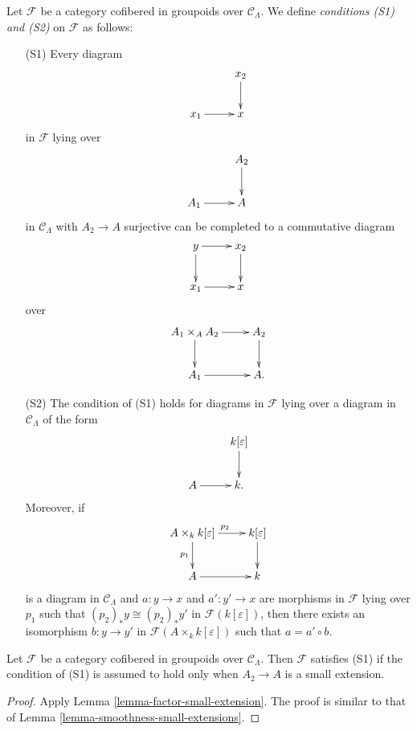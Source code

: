 \begin{definition}
\label{definition-S1-S2}
Let $\mathcal F$ be a category cofibered in groupoids over $\mathcal 
C_{\Lambda}$. We define {\it conditions (S1) and (S2)}
on $\mathcal F$ as follows:
\begin{enumerate}
\item[(S1)] Every diagram
\[
\xymatrix{
           & x_2 \ar[d] \\
x_1 \ar[r] & x   
}
\]
in $\mathcal F$ lying over
\[
\xymatrix{
           & A_2 \ar[d] \\
A_1 \ar[r] & A   
}
\]  
in $\mathcal C_{\Lambda}$ with $A_2 \rightarrow A$ surjective can be completed 
to a commutative diagram
\[
\xymatrix{
y \ar[r] \ar[d] & x_2 \ar[d] \\
x_1 \ar[r]      & x   
}
\]
over
\[
\xymatrix{
A_1 \times_{A} A_2 \ar[r] \ar[d] & A_2 \ar[d] \\ 
A_1 \ar[r]      & A.   
}
\]

\item[(S2)] The condition of (S1) holds for diagrams in $\mathcal F$ lying over 
a diagram in $\mathcal C_{\Lambda}$ of the form
\[
\xymatrix{
          & k[\varepsilon] \ar[d] \\
A  \ar[r] & k . 
}
\]  
Moreover, if
\[
\xymatrix{
A \times_{k} k[\varepsilon]  \ar[r]^{p_2} \ar[d]_{p_1}  & k[\varepsilon] \ar[d] 
\\
A  \ar[r] & k 
}
\]  
is a diagram in $\mathcal C_{\Lambda}$ and $a: y \rightarrow x$ and $a': y' 
\rightarrow x$ are morphisms in $\mathcal F$ lying over $p_{1}$ such that 
$(p_2)_{*}y \cong (p_2)_{*}y'$ in $\mathcal F(k[\varepsilon])$, then there 
exists an isomorphism $b: y \rightarrow y'$ in $\mathcal F(A \times_{k} 
k[\varepsilon])$ such that $a = a' \circ b$.
\end{enumerate}
\end{definition}

\begin{lemma}
\label{lemma-S1-small-extensions}
Let $\mathcal F$ be a category cofibered in groupoids over $\mathcal 
C_{\Lambda}$. Then $\mathcal F$ satisfies \textnormal{(S1)} if the condition of 
\textnormal{(S1)} is assumed to hold only when $A_2 \rightarrow A$ is a small 
extension.
\end{lemma}

\begin{proof}
Apply Lemma \ref{lemma-factor-small-extension}.  The proof is similar to that 
of Lemma \ref{lemma-smoothness-small-extensions}.
\end{proof}

